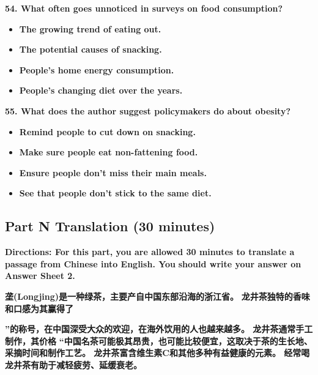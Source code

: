 \documentclass[UTF8,11pt]{ctexart}
\begin{document}
\textbf{54. What often goes unnoticed in surveys on food consumption?}


\begin{itemize}[leftmargin=2em,itemsep=.2em,topsep=.4em]\item[A.] \textbf{The growing trend of eating out.}
\item[B.] \textbf{The potential causes of snacking.}
\item[C.] \textbf{People's home energy consumption.}
\item[D.] \textbf{People's changing diet over the years.}
\end{itemize}

\textbf{55. What does the author suggest policymakers do about obesity?}


\begin{itemize}[leftmargin=2em,itemsep=.2em,topsep=.4em]\item[A.] \textbf{Remind people to cut down on snacking.}
\item[B.] \textbf{Make sure people eat non-fattening food.}
\item[C.] \textbf{Ensure people don't miss their main meals.}
\item[D.] \textbf{See that people don't stick to the same diet.}
\end{itemize}

\subsection*{Part N Translation (30 minutes)}


\textbf{Directions: For this part, you are allowed 30 minutes to translate a passage from Chinese into English. You} \textbf{should write your answer on Answer Sheet 2.}


\textbf{垄(Longjing)是一种绿茶，主要产自中国东部沿海的浙江省。} \textbf{龙井茶独特的香味和口感为其赢得了}


\textbf{”的称号，在中国深受大众的欢迎，在海外饮用的人也越来越多。 龙井茶通常手工制作，其价格} \textbf{“中国名茶可能极其昂贵，也可能比较便宜，这取决于茶的生长地、采摘时间和制作工艺。 龙井茶富含维生素C和其他多种有益健康的元素。 经常喝龙井茶有助于减轻疲劳、延缓衰老。}
\end{document}
